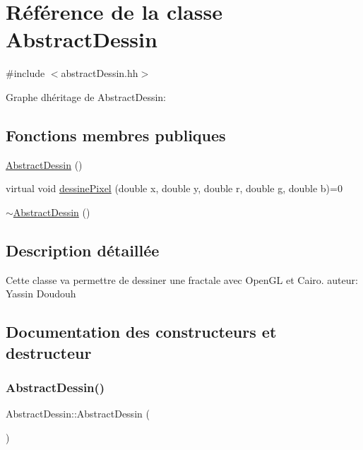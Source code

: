 \hypertarget{classAbstractDessin}{}\section{Référence de la classe Abstract\+Dessin}
\label{classAbstractDessin}


{\ttfamily \#include $<$abstract\+Dessin.\+hh$>$}



Graphe d\textquotesingle{}héritage de Abstract\+Dessin\+:
\subsection*{Fonctions membres publiques}
\begin{DoxyCompactItemize}
\item 
\hyperlink{classAbstractDessin_a94c5e04f6c24547bb695aed595914a4f}{Abstract\+Dessin} ()
\item 
virtual void \hyperlink{classAbstractDessin_a82983d17a63c236c5ca8f4966195ffe3}{dessine\+Pixel} (double x, double y, double r, double g, double b)=0
\item 
\hyperlink{classAbstractDessin_ae543a92c1fe3b3f2b6e045a8f9b6e36d}{$\sim$\+Abstract\+Dessin} ()
\end{DoxyCompactItemize}


\subsection{Description détaillée}
Cette classe va permettre de dessiner une fractale avec Open\+GL et Cairo. auteur\+: Yassin Doudouh 

\subsection{Documentation des constructeurs et destructeur}
\mbox{\label{classAbstractDessin_a94c5e04f6c24547bb695aed595914a4f}} 
\subsubsection{\texorpdfstring{Abstract\+Dessin()}{AbstractDessin()}}
{\footnotesize\ttfamily Abstract\+Dessin\+::\+Abstract\+Dessin (\begin{DoxyParamCaption}{ }\end{DoxyParamCaption})}

